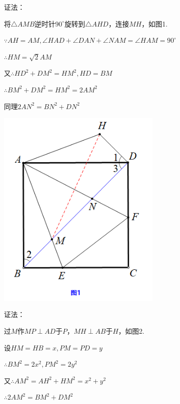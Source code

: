 \documentclass[10pt]{ctexart}
\begin{document}
{\kaishu\color{blue}
\begin{minipage}[h]{0.6\textwidth}
证法：
	
将$\triangle AMB$逆时针$90^\circ$旋转到$\triangle AHD$，连接$MH$，如图1.

$\because AH=AM,\angle HAD+\angle DAN+\angle NAM=\angle HAM=90^\circ$

$\therefore HM=\sqrt{2}AM$

又$\therefore HD^2+DM^2=HM^2,HD=BM$


$\therefore BM^2+DM^2=HM^2=2AM^2$

同理$2AN^2=BN^2+DN^2$	

\end{minipage}
\quad
\begin{minipage}[h]{0.4\textwidth}
	\centering
	\includegraphics[width=0.6\textwidth]{figure/banjiao14}
\end{minipage}

\begin{minipage}[h]{0.6\textwidth}
	证法：
	
过$M$作$MP \perp AD$于$P$，$MH \perp AB$于$H$，如图2.

设$HM=HB=x,PM=PD=y$

$\therefore BM^2=2x^2,PM^2=2y^2$

又$\therefore AM^2=AH^2+HM^2=x^2+y^2$

$\therefore 2AM^2=BM^2+DM^2$


\end{minipage}}
\end{document}
